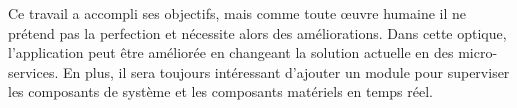 Ce travail a accompli ses objectifs, mais comme toute œuvre humaine il ne prétend pas la perfection et nécessite alors des améliorations. Dans cette optique, l'application peut être améliorée en changeant la solution actuelle en des micro-services. En plus, il sera toujours intéressant d'ajouter un module pour superviser les composants de système et les composants matériels en temps réel.\\
